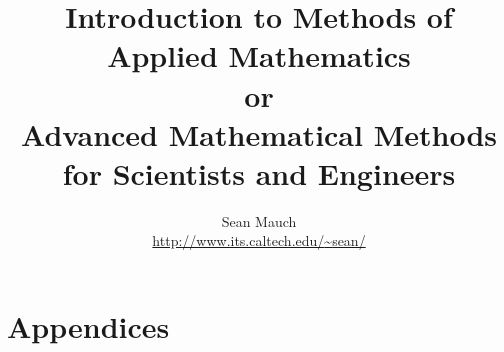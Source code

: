 \documentclass{book}
\title{Introduction to Methods of Applied Mathematics\\
        or\\
        Advanced Mathematical Methods for Scientists and Engineers}
\author{Sean Mauch\\
  \href{http://www.its.caltech.edu/~sean/}
       {http://www.its.caltech.edu/{\~{}}sean/}
}
\begin{document}
%
\maketitle

\frontmatter

\tableofcontents






\mainmatter















\part{Appendices}



\backmatter




\printindex
\end{document}
